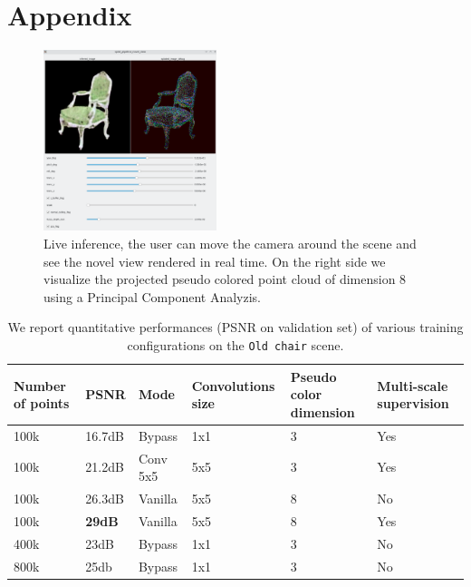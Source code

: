 \section{Appendix}


\begin{figure}[H]
    \centering
    \includegraphics[width=0.45\textwidth]{figures/inference_live.png}
    \caption{Live inference, the user can move the camera around the scene and see the novel view rendered in real time. On the right side we visualize the projected pseudo colored point cloud of dimension 8 using a Principal Component Analyzis.}
    \label{fig:live_inference}
\end{figure}



\begin{table}[htpb]
    \begin{tabular}{|l|l|l|l|l|l|}
    \hline
    Number of points & PSNR   & Mode     & Convolutions size & Pseudo color dimension & Multi-scale supervision \\ \hline
    100k             & 16.7dB & Bypass   & 1x1               & 3                      & Yes                     \\ \hline
    100k             & 21.2dB & Conv 5x5 & 5x5               & 3                      & Yes                     \\ \hline
    100k             & 26.3dB & Vanilla  & 5x5               & 8                      & No                      \\ \hline
    100k             & \textbf{29dB}   & Vanilla  & 5x5               & 8                      & Yes                     \\ \hline
    400k             & 23dB   & Bypass   & 1x1               & 3                      & No                      \\ \hline
    800k             & 25db   & Bypass   & 1x1               & 3                      & No                      \\ \hline
\end{tabular}
\caption{We report quantitative performances (PSNR on validation set) of various training configurations on the \texttt{Old chair} scene.}
\label{tab:results}
\end{table}